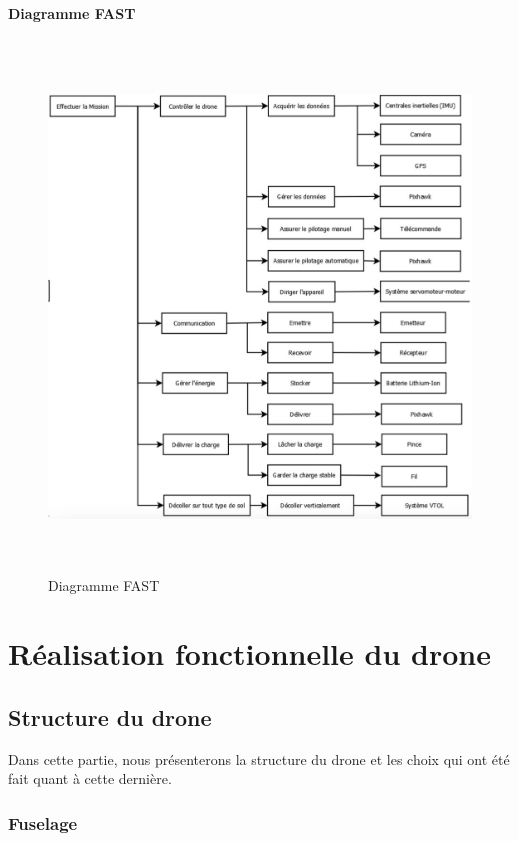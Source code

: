 \documentclass[a4paper,12pt,french]{report}
\begin{document}
\subsubsection*{Diagramme FAST}

\begin{figure}[h]
    \centering
    \includegraphics[height=14cm]{figures/fast.png}
    \caption{Diagramme FAST}
    \label{fonctions}
\end{figure}

\chapter{Réalisation fonctionnelle du drone}

\section{Structure du drone}

Dans cette partie, nous présenterons la structure du drone et les choix qui ont été fait quant à cette dernière.

\subsection{Fuselage}
\end{document}
